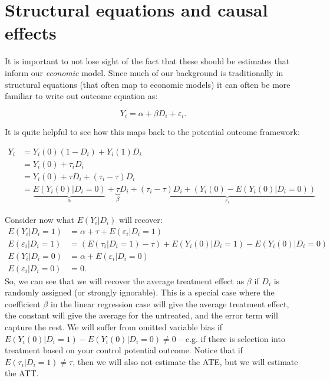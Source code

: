 \documentclass{tufte-handout}
\theoremstyle{break}
\begin{document}
\section{Structural equations and causal effects}
It is important to not lose sight of the fact that these should be estimates that inform our \emph{economic} model. Since much of our background is traditionally in structural equations (that often map to economic models) it can often be more familiar to write out outcome equation as:

\begin{equation*}
  Y_{i} = \alpha + \beta D_{i} + \varepsilon_{i}.
\end{equation*}

It is quite helpful to see how this maps back to the potential outcome framework:

\begin{align*}
  Y_{i} &= Y_{i}(0)(1 - D_{i}) + Y_{i}(1)D_{i}\\
  &= Y_{i}(0) + \tau_{i}D_{i}\\
  &= Y_{i}(0) + \tau D_{i} + (\tau_{i} - \tau)D_{i}\\
  &= \underbrace{E(Y_{i}(0) | D_{i} = 0)}_{\alpha} + \underbrace{\tau}_{\beta} D_{i} + \underbrace{(\tau_{i} - \tau)D_{i} + (Y_{i}(0)-E(Y_{i}(0) | D_{i} = 0))}_{\varepsilon_{i}}
\end{align*}

Consider now what $E(Y_{i} | D_{i})$ will recover:
\begin{align*}
  E(Y_{i} | D_{i} = 1) &= \alpha + \tau + E(\varepsilon_{i} | D_{i} = 1)\\
  E(\varepsilon_{i} | D_{i} = 1) &= (E(\tau_{i} | D_{i}=1) - \tau)  + E(Y_{i}(0) | D_{i} = 1) -  E(Y_{i}(0) | D_{i} = 0)\\
  E(Y_{i} | D_{i} = 0) &= \alpha + E(\varepsilon_{i} | D_{i} = 0)\\
  E(\varepsilon_{i} | D_{i} = 0) &= 0.
\end{align*}
So, we can see that we will recover the average treatment effect as $\beta$ if $D_{i}$ is randomly assigned (or strongly ignorable).  This is a special case where the coefficient $\beta$ in the linear regression case will give the average treatment effect, the constant will give the average for the untreated, and the error term will capture the rest. We will suffer from omitted variable bias if $ E(Y_{i}(0) | D_{i} = 1) -  E(Y_{i}(0) | D_{i} = 0) \neq 0$ -- e.g. if there is selection into treatment based on your control potential outcome. Notice that if $E(\tau_{i} | D_{i} =1) \not=\tau$, then we will also not estimate the ATE, but we will estimate the ATT.
\end{document}
